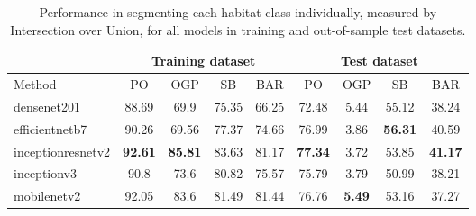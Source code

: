 \begin{table}[H]
    \centering
    \caption[Model performance per habitat class]{Performance in segmenting
        each habitat class individually,
        measured by Intersection over Union, for all models in training and
        out-of-sample test datasets.}
    \label{tab:metrics_classes}
    \begin{tabular}{lcccc|cccc}
        \toprule
                            & \multicolumn{4}{c}{Training dataset} &
        \multicolumn{4}{|c}{Test
            dataset}

        \\
        \midrule
        Method              & PO                                   & OGP
                            & SB                                   & BAR
                            & PO                                   & OGP
                            & SB
                            & BAR

        \\
        \midrule
        densenet201         & 88.69                                & 69.9
                            & 75.35                                & 66.25
                            & 72.48                                & 5.44
                            &
        55.12               & 38.24

        \\
        efficientnetb7      & 90.26                                & 69.56
                            & 77.37                                & 74.66
                            & 76.99                                & 3.86
                            &
        \textbf{56.31}      & 40.59

        \\
        inceptionresnetv2   & \textbf{92.61}                       &
        \textbf{85.81}      & 83.63                                & 81.17
                            &
        \textbf{77.34}      & 3.72                                 & 53.85
                            & \textbf{41.17}
        \\
        inceptionv3         & 90.8                                 & 73.6
                            & 80.82                                & 75.57
                            & 75.79                                & 3.79
                            &
        50.99               & 38.21

        \\
        mobilenetv2         & 92.05                                & 83.6
                            & 81.49                                & 81.44
                            & 76.76                                &
        \textbf{5.49}       & 53.16                                & 37.27


\end{tabular}
\end{table}
